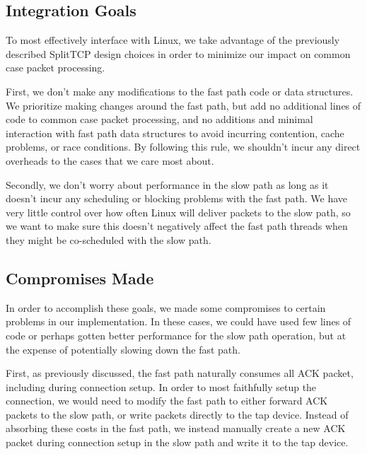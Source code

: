 \subsection{Integration Goals}

To most effectively interface with Linux, we take advantage of the previously 
described SplitTCP design choices in order to minimize our impact on common case
packet processing. 

First, we don't make any modifications to the fast path code or data structures.
We prioritize making changes around the fast path, but add no additional lines 
of code to common case packet processing, and no additions and minimal 
interaction with fast path data structures to avoid incurring contention, cache 
problems, or race conditions. By following this rule, we shouldn't incur any
direct overheads to the cases that we care most about.

Secondly, we don't worry about performance in the slow path as long as it
doesn't incur any scheduling or blocking problems with the fast path. We have 
very little control over how often Linux will deliver packets to the slow path, 
so we want to make sure this doesn't negatively affect the fast path threads 
when they might be co-scheduled with the slow path.

\subsection{Compromises Made}

In order to accomplish these goals, we made some compromises to certain problems
in our implementation. In these cases, we could have used few lines of code or 
perhaps gotten better performance for the slow path operation, but at the 
expense of potentially slowing down the fast path.

First, as previously discussed, the fast path naturally consumes all ACK packet,
including during connection setup. In order to most faithfully setup the 
connection, we would need to modify the fast path to either forward ACK packets 
to the slow path, or write packets directly to the tap device. Instead of 
absorbing these costs in the fast path, we instead manually create a new ACK
packet during connection setup in the slow path and write it to the tap device.

